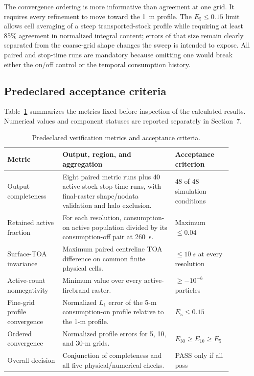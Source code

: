 The convergence ordering is more informative than agreement at one grid.  It
requires every refinement to move toward the \SI{1}{m} profile.  The
\(E_5\le0.15\) limit allows cell averaging of a steep transported-stock
profile while requiring at least 85\% agreement in normalized integral
content; errors of that size remain clearly separated from the coarse-grid
shape changes the sweep is intended to expose.  All paired and stop-time runs
are mandatory because omitting one would break either the on/off control or
the temporal consumption history.

\subsection{Predeclared acceptance criteria}

Table~\ref{tab:acceptance-contract} summarizes the metrics fixed before
inspection of the calculated results. Numerical values and component statuses
are reported separately in Section~7.

\begin{table}[H]
\centering
\footnotesize
\caption{Predeclared verification metrics and acceptance criteria.}
\label{tab:acceptance-contract}
\begin{tabular}{@{}p{0.23\linewidth}p{0.47\linewidth}p{0.21\linewidth}@{}}
\toprule
Metric & Output, region, and aggregation & Acceptance criterion\\
\midrule
Output completeness & Eight paired metric runs plus 40 active-stock stop-time runs, with final-raster shape/nodata validation and halo exclusion. & 48 of 48 simulation conditions \\
Retained active fraction & For each resolution, consumption-on active population divided by its consumption-off pair at \SI{260}{s}. & Maximum \(\le0.04\) \\
Surface-TOA invariance & Maximum paired centreline TOA difference on common finite physical cells. & \(\le\SI{10}{s}\) at every resolution \\
Active-count nonnegativity & Minimum value over every active-firebrand raster. & \(\ge-10^{-6}\) particles \\
Fine-grid profile convergence & Normalized \(L_1\) error of the 5-m consumption-on profile relative to the 1-m profile. & \(E_5\le0.15\) \\
Ordered convergence & Normalized profile errors for 5, 10, and 30-m grids. & \(E_{30}\ge E_{10}\ge E_5\) \\
Overall decision & Conjunction of completeness and all five physical/numerical checks. & PASS only if all pass \\
\bottomrule
\end{tabular}
\end{table}

